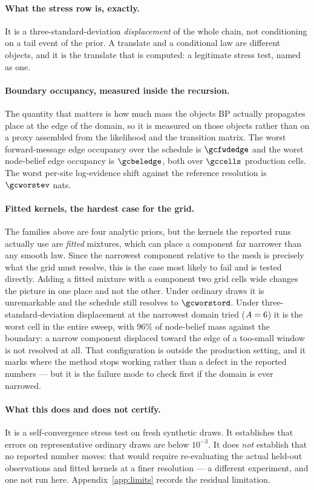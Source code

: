 \paragraph{What the stress row is, exactly.} It is a three-standard-deviation
\emph{displacement} of the whole chain, not conditioning on a tail event of the prior. A translate
and a conditional law are different objects, and it is the translate that is computed: a
legitimate stress test, named as one.

\paragraph{Boundary occupancy, measured inside the recursion.} The quantity that matters is how
much mass the objects BP actually propagates place at the edge of the domain, so it is measured on
those objects rather than on a proxy assembled from the likelihood and the transition matrix. The
worst forward-message edge occupancy over the schedule is $\gcfwdedge$ and the worst node-belief
edge occupancy is $\gcbeledge$, both over $\gccells$ production cells. The worst per-site
log-evidence shift against the reference resolution is $\gcworstev$ nats.

\paragraph{Fitted kernels, the hardest case for the grid.} The families above are four analytic
priors, but the kernels the reported runs actually use are \emph{fitted} mixtures, which can place
a component far narrower than any smooth law. Since the narrowest component relative to the mesh is
precisely what the grid must resolve, this is the case most likely to fail and is tested directly.
Adding a fitted mixture with a component two grid cells wide changes the picture in one place and
not the other. Under ordinary draws it is unremarkable and the schedule still
resolves to $\gcworstord$. Under three-standard-deviation displacement at the narrowest domain
tried ($A=6$) it is the worst cell in the entire sweep, with $96\%$ of node-belief mass
against the boundary: a narrow component displaced toward the edge of a too-small window is not
resolved at all. That configuration is outside the production setting, and it marks where the
method stops working rather than a defect in the reported numbers --- but it is the failure mode to
check first if the domain is ever narrowed.

\paragraph{What this does and does not certify.} It is a self-convergence stress test on fresh
synthetic draws. It establishes that errors on representative ordinary draws are below $10^{-3}$.
It does \emph{not} establish that no reported number moves: that would require re-evaluating the
actual held-out observations and fitted kernels at a finer resolution --- a different experiment,
and one not run here. Appendix~\ref{app:limits} records the residual limitation.

